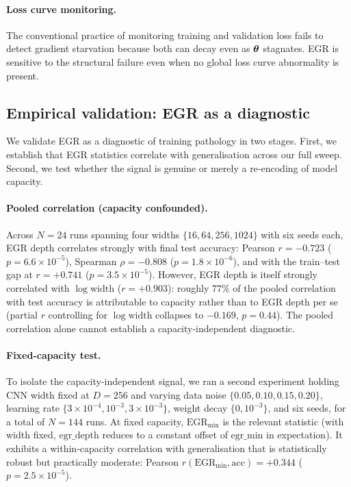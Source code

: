 \paragraph{Loss curve monitoring.}
The conventional practice of monitoring training and validation loss
fails to detect gradient starvation because both can decay even as
${\boldsymbol{\theta}}$ stagnates. EGR is sensitive to the structural failure
even when no global loss curve abnormality is present.

\subsection{Empirical validation: EGR as a diagnostic}
\label{sec:egr-empirical}

We validate EGR as a diagnostic of training pathology in two stages.
First, we establish that EGR statistics correlate with generalisation
across our full sweep. Second, we test whether the signal is genuine
or merely a re-encoding of model capacity.

\paragraph{Pooled correlation (capacity confounded).}
Across $N=24$ runs spanning four widths $\{16,64,256,1024\}$ with six
seeds each, EGR depth correlates strongly with final test accuracy:
Pearson $r = -0.723$ ($p = 6.6\times 10^{-5}$), Spearman $\rho = -0.808$
($p = 1.8\times 10^{-6}$), and with the train--test gap at $r = +0.741$
($p = 3.5\times 10^{-5}$). However, EGR depth is itself strongly
correlated with $\log\mathrm{width}$ ($r = +0.903$): roughly $77\%$ of
the pooled correlation with test accuracy is attributable to capacity
rather than to EGR depth per se (partial $r$ controlling for
$\log\mathrm{width}$ collapses to $-0.169$, $p = 0.44$). The pooled
correlation alone cannot establish a capacity-independent diagnostic.

\paragraph{Fixed-capacity test.}
To isolate the capacity-independent signal, we ran a second experiment
holding CNN width fixed at $D = 256$ and varying data noise
$\{0.05,0.10,0.15,0.20\}$, learning rate
$\{3{\times}10^{-4},10^{-3},3{\times}10^{-3}\}$, weight decay
$\{0,10^{-3}\}$, and six seeds, for a total of $N = 144$ runs. At fixed
capacity, $\mathrm{EGR}_{\min}$ is the relevant statistic (with width
fixed, $\mathrm{egr\_depth}$ reduces to a constant offset of
$\mathrm{egr\_min}$ in expectation). It exhibits a within-capacity
correlation with generalisation that is statistically robust but
practically moderate: Pearson $r(\mathrm{EGR}_{\min}, \mathrm{acc}) =
+0.344$ ($p = 2.5\times 10^{-5}$).

